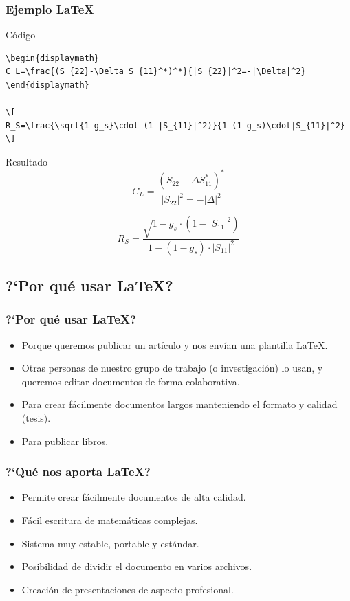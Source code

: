 \documentclass[aspectratio=43]{beamer}%
\begin{document}
\begin{frame}[fragile]
\frametitle{\textbf{Ejemplo \LaTeX{}}}
\justifying
 \begin{block}{Código}
   \lstset{language=TEX,basicstyle=\small}
   \vspace{-0.8cm}
\begin{lstlisting}
\begin{displaymath}
C_L=\frac{(S_{22}-\Delta S_{11}^*)^*}{|S_{22}|^2=-|\Delta|^2}
\end{displaymath}
    
\[
R_S=\frac{\sqrt{1-g_s}\cdot (1-|S_{11}|^2)}{1-(1-g_s)\cdot|S_{11}|^2}
\]
\end{lstlisting}\vspace{-0.3cm}

\end{block}


\begin{exampleblock}{Resultado}
\begin{displaymath}
C_L=\frac{(S_{22}-\Delta S_{11}^*)^*}{|S_{22}|^2=-|\Delta|^2}
\end{displaymath}
    
\[
R_S=\frac{\sqrt{1-g_s}\cdot (1-|S_{11}|^2)}{1-(1-g_s)\cdot|S_{11}|^2}
\]

\end{exampleblock}

\end{frame}

\subsection{?`Por qué usar \LaTeX{}?}

\begin{frame}[fragile]
\frametitle{\textbf{?`Por qué usar \LaTeX{}?}}
\justifying
 \begin{itemize}\justifying
  \item Porque queremos publicar un artículo y nos envían una plantilla \LaTeX{}.
  \item Otras personas de nuestro grupo de trabajo (o investigación) lo usan, y queremos editar documentos de forma colaborativa.
  \item Para crear fácilmente documentos largos manteniendo el formato y calidad (tesis).
  \item Para publicar libros.
\end{itemize}
\end{frame}

\begin{frame}[fragile]
\frametitle{\textbf{?`Qué nos aporta \LaTeX{}?}}
\justifying
 \begin{itemize}\justifying
  \item Permite crear fácilmente documentos de alta calidad.
  \item Fácil escritura de matemáticas complejas.
  \item Sistema muy estable, portable y estándar.
  \item Posibilidad de dividir el documento en varios archivos.
  \item Creación de presentaciones de aspecto profesional.
\end{itemize}
\end{frame}
\end{document}
